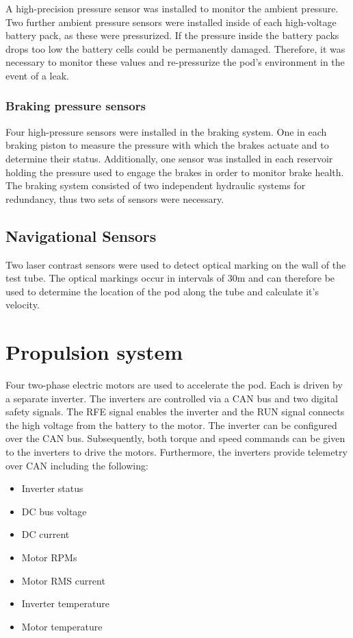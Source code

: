 A high-precision pressure sensor was installed to monitor the ambient pressure. Two further ambient pressure sensors were installed inside of each high-voltage battery pack, as these were pressurized. If the pressure inside the battery packs drops too low the battery cells could be permanently damaged. Therefore, it was necessary to monitor these values and re-pressurize the pod's environment in the event of a leak.

\subsubsection{Braking pressure sensors}

Four high-pressure sensors were installed in the braking system. One in each braking piston to measure the pressure with which the brakes actuate and to determine their status. Additionally, one sensor was installed in each reservoir holding the pressure used to engage the brakes in order to monitor brake health. The braking system consisted of two independent hydraulic systems for redundancy, thus two sets of sensors were necessary.

\subsection{Navigational Sensors}

Two laser contrast sensors were used to detect optical marking on the wall of the test tube. The optical markings occur in intervals of 30m and can therefore be used to determine the location of the pod along the tube and calculate it's velocity.

\section{Propulsion system} \label{spec_inverter}

Four two-phase electric motors are used to accelerate the pod. Each is driven by a separate inverter. The inverters are controlled via a CAN bus and two digital safety signals. The RFE signal enables the inverter and the RUN signal connects the high voltage from the battery to the motor. The inverter can be configured over the CAN bus. Subsequently, both torque and speed commands can be given to the inverters to drive the motors. Furthermore, the inverters provide telemetry over CAN including the following:

\begin{itemize}
    \item Inverter status
    \item DC bus voltage
    \item DC current
    \item Motor RPMs
    \item Motor RMS current
    \item Inverter temperature
    \item Motor temperature
\end{itemize}

